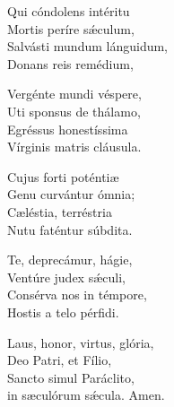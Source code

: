  Qui cóndolens intéritu\\ 
    Mortis períre sǽculum,\\  
    Salvásti mundum lánguidum,\\  
    Donans reis remédium, 

 Vergénte mundi véspere,\\  
    Uti sponsus de thálamo,\\  
    Egréssus honestíssima\\  
    Vírginis matris cláusula. 

 Cujus forti pot\-éntiæ\\  
    Genu curvántur ó\-mnia;\\  
    Cæléstia, terréstria\\  
     Nutu faténtur súbdita. 

 Te, deprecámur, hágie,\\  
    Ventúre judex sǽculi,\\  
    Consérva nos in témpore,\\  
    Hostis a telo pérfidi. 

 Laus, honor, virtus, glória,\\  
    Deo Patri, et Fílio,\\  
    San\-cto simul Paráclito,\\  
    in sæculórum sǽcula. 
Amen.